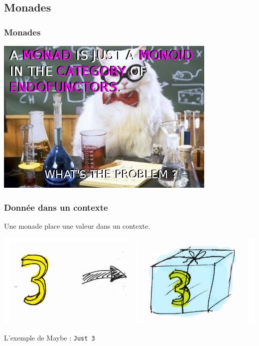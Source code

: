 \documentclass{beamer}
\begin{document}
\subsection{Monades}

\begin{frame}

\frametitle{Monades}
\begin{center}
\includegraphics[scale=0.7]{cat.png}
\end{center}
\end{frame}

\begin{frame}
\frametitle{Donnée dans un contexte}

\begin{block}{}
Une monade place une valeur dans un contexte.
\end{block}

\begin{center}
\includegraphics[scale=0.3]{just3.png}
\end{center}

\begin{exampleblock}{}
L'exemple de Maybe : \verb!Just 3!
\end{exampleblock}
\end{frame}
\end{document}

